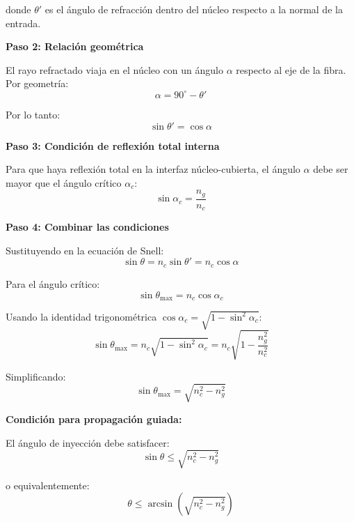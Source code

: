 \documentclass[11pt,a4paper]{article}
\begin{document}
donde $\theta'$ es el ángulo de refracción dentro del núcleo respecto a la normal de la entrada.

\textbf{Paso 2: Relación geométrica}

El rayo refractado viaja en el núcleo con un ángulo $\alpha$ respecto al eje de la fibra. Por geometría:
\begin{equation}
    \alpha = 90^{\circ} - \theta'
\end{equation}

Por lo tanto:
\begin{equation}
    \sin\theta' = \cos\alpha
\end{equation}

\textbf{Paso 3: Condición de reflexión total interna}

Para que haya reflexión total en la interfaz núcleo-cubierta, el ángulo $\alpha$ debe ser mayor que el ángulo crítico $\alpha_c$:
\begin{equation}
    \sin\alpha_c = \frac{n_g}{n_c}
\end{equation}

\textbf{Paso 4: Combinar las condiciones}

Sustituyendo en la ecuación de Snell:
\begin{equation}
    \sin\theta = n_c \sin\theta' = n_c \cos\alpha
\end{equation}

Para el ángulo crítico:
\begin{equation}
    \sin\theta_{\max} = n_c \cos\alpha_c
\end{equation}

Usando la identidad trigonométrica $\cos\alpha_c = \sqrt{1 - \sin^2\alpha_c}$:
\begin{equation}
    \sin\theta_{\max} = n_c \sqrt{1 - \sin^2\alpha_c} = n_c \sqrt{1 - \frac{n_g^2}{n_c^2}}
\end{equation}

Simplificando:
\begin{equation}
    \sin\theta_{\max} = \sqrt{n_c^2 - n_g^2}
\end{equation}

\textbf{Condición para propagación guiada:}

El ángulo de inyección debe satisfacer:
\begin{equation}
    \sin\theta \leq \sqrt{n_c^2 - n_g^2}
\end{equation}

o equivalentemente:
\begin{equation}
    \theta \leq \arcsin\left(\sqrt{n_c^2 - n_g^2}\right)
\end{equation}
\end{document}
